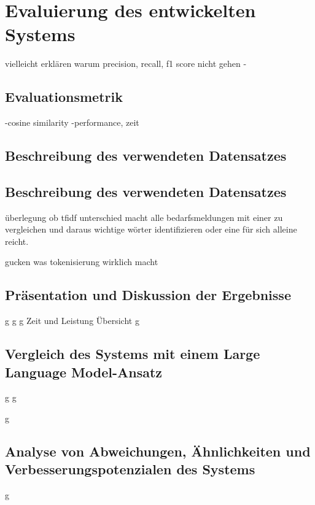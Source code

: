 \chapter{Evaluierung des entwickelten Systems}
\label{chap:evaluierung}

vielleicht erklären warum precision, recall, f1 score nicht gehen -

\section{Evaluationsmetrik}
-cosine similarity
-performance, zeit

\section{Beschreibung des verwendeten Datensatzes}
\newpage

\section{Beschreibung des verwendeten Datensatzes}

überlegung ob tfidf unterschied macht alle bedarfsmeldungen mit einer zu vergleichen und daraus wichtige wörter identifizieren oder eine für sich alleine reicht.

gucken was tokenisierung wirklich macht
\section{Präsentation und Diskussion der Ergebnisse}
\newpage
g
\newpage
g
\newpage
g
\newpage
Zeit und Leistung Übersicht
\newpage
g
\newpage

\section{Vergleich des Systems mit einem Large Language Model-Ansatz}
\newpage
g
\newpage
g
\newpage

g
\newpage

\section{Analyse von Abweichungen, Ähnlichkeiten und Verbesserungspotenzialen des Systems}
\newpage
g
\newpage
